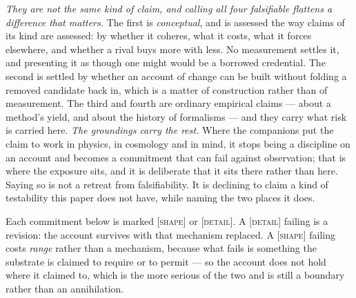 \documentclass[11pt,a4paper]{article}
\begin{document}
\emph{They are not the same kind of claim, and calling all four falsifiable flattens a difference that
matters.} The first is \emph{conceptual}, and is assessed the way claims of its kind are assessed: by
whether it coheres, what it costs, what it forces elsewhere, and whether a rival buys more with less.
No measurement settles it, and presenting it as though one might would be a borrowed credential. The
second is settled by whether an account of change can be built without folding a removed candidate back
in, which is a matter of construction rather than of measurement. The third and fourth are ordinary
empirical claims --- about a method's yield, and about the history of formalisms --- and they carry
what risk is carried here. \emph{The groundings carry the rest.}
Where the companions put the claim to work in physics, in cosmology and in mind, it stops being a
discipline on an account and becomes a commitment that can fail against observation; that is where the
exposure sits, and it is deliberate that it sits there rather than here. Saying so is not a retreat
from falsifiability. It is declining to claim a kind of testability this paper does not have, while
naming the two places it does.

Each commitment below is marked \textsc{[shape]} or \textsc{[detail]}. A \textsc{[detail]} failing is
a revision: the account survives with that mechanism replaced. A \textsc{[shape]} failing costs
\emph{range} rather than a mechanism, because what fails is something the substrate is claimed to
require or to permit --- so the account does not hold where it claimed to, which is the more serious
of the two and is still a boundary rather than an annihilation.
\end{document}
